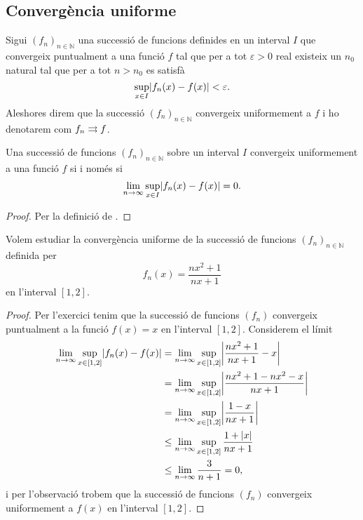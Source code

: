 \documentclass[../Apunts.tex]{subfiles}
\begin{document}
	\subsection{Convergència uniforme}
	\begin{definition}
		\label{def:convergència uniforme}
		Sigui \((f_{n})_{n\in\mathbb{N}}\) una successió de funcions definides en un interval \(I\) que convergeix puntualment a una funció \(f\) tal que per a tot \(\varepsilon>0\) real existeix un \(n_{0}\) natural tal que per a tot \(n>n_{0}\) es satisfà
		\[\sup_{x\in I}\abs{f_{n}(x)-f(x)}<\varepsilon.\]
		Aleshores direm que la successió \((f_{n})_{n\in\mathbb{N}}\) convergeix uniformement a \(f\) i ho denotarem com \(f_{n}\rightrightarrows f\).
	\end{definition}
	\begin{observation}
		\label{obs:convergència uniforme amb límits}
		Una successió de funcions \((f_{n})_{n\in\mathbb{N}}\) sobre un interval \(I\) convergeix uniformement a una funció \(f\) si i només si
		\[\lim_{n\to\infty}\sup_{x\in I}\abs{f_{n}(x)-f(x)}=0.\]
		\begin{proof}
			Per la definició de .
		\end{proof}
	\end{observation}
	\begin{example}
		\label{ex:convergència uniforme d'una successió de funcions}
		Volem estudiar la convergència uniforme de la successió de funcions \((f_{n})_{n\in\mathbb{N}}\) definida per
		\[f_{n}(x)=\frac{nx^{2}+1}{nx+1}\]
		en l'interval \([1,2]\).
		\begin{proof}
			Per l'exercici  tenim que la successió de funcions \((f_{n})\) convergeix puntualment a la funció \(f(x)=x\) en l'interval \([1,2]\). Considerem el límit
			\begin{align*}
				\lim_{n\to\infty}\sup_{x\in[1,2]}\abs{f_{n}(x)-f(x)}&=\lim_{n\to\infty}\sup_{x\in[1,2]}\abs{\frac{nx^{2}+1}{nx+1}-x} \\
				&=\lim_{n\to\infty}\sup_{x\in[1,2]}\abs{\frac{nx^{2}+1-nx^{2}-x}{nx+1}} \\
				&=\lim_{n\to\infty}\sup_{x\in[1,2]}\abs{\frac{1-x}{nx+1}} \\
				&\leq\lim_{n\to\infty}\sup_{x\in[1,2]}\frac{1+\abs{x}}{nx+1} \\
				&\leq\lim_{n\to\infty}\frac{3}{n+1}=0,
			\end{align*}
			i per l'observació  trobem que la successió de funcions \((f_{n})\) convergeix uniformement a \(f(x)\) en l'interval \([1,2]\). 
		\end{proof}
	\end{example}
\end{document}
